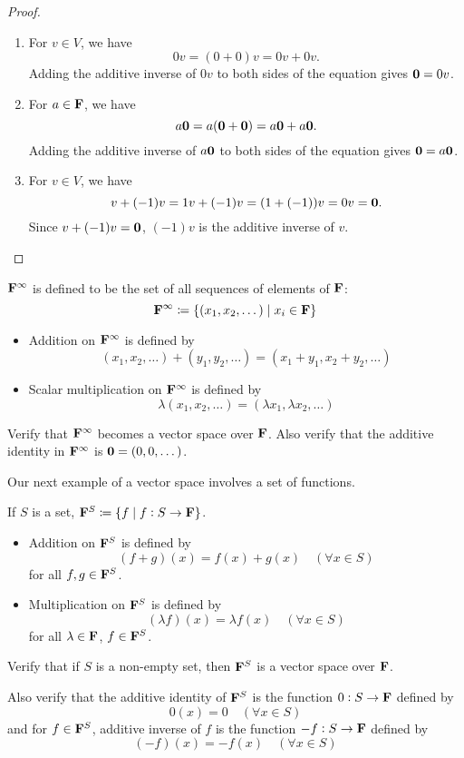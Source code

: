 \begin{proof} \
\begin{enumerate}[label=(\roman*)]
\item For $v\in V$, we have
\[0v=(0+0)v=0v+0v.\]
Adding the additive inverse of $0v$ to both sides of the equation gives $\vb{0}=0v$.

\item For $a\in\mathbf F$, we have
\[a\vb{0}=a(\vb{0}+\vb{0})=a\vb{0}+a\vb{0}.\]
Adding the additive inverse of $a\vb{0}$ to both sides of the equation gives $\vb{0}=a\vb{0}$.

\item For $v\in V$, we have
\[v+(-1)v=1v+(-1)v=(1+(-1))v=0v=\vb{0}.\]
Since $v+(-1)v=\vb{0}$, $(-1)v$ is the additive inverse of $v$.
\end{enumerate}
\end{proof}

\begin{example}
$\mathbf F^\infty$ is defined to be the set of all sequences of elements of $\mathbf F$:
\[\mathbf F^\infty\coloneqq\{(x_1,x_2,\dots)\mid x_i\in\mathbf F\}\]
\begin{itemize}
\item Addition on $\mathbf F^\infty$ is defined by
\[(x_1,x_2,\dots)+(y_1,y_2,\dots)=(x_1+y_1,x_2+y_2,\dots)\]
\item Scalar multiplication on $\mathbf F^\infty$ is defined by
\[\lambda(x_1,x_2,\dots)=(\lambda x_1,\lambda x_2,\dots)\]
\end{itemize}

Verify that $\mathbf F^\infty$ becomes a vector space over $\mathbf F$. Also verify that the additive identity in $\mathbf F^\infty$ is $\vb{0}=(0,0,\dots)$.
\end{example}

Our next example of a vector space involves a set of functions.

\begin{example}
If $S$ is a set, $\mathbf F^S\coloneqq\{f\mid f:S\to\mathbf F\}$.
\begin{itemize}
\item Addition on $\mathbf F^S$ is defined by 
\[(f+g)(x)=f(x)+g(x)\quad(\forall x\in S)\]
for all $f,g\in\mathbf F^S$.
\item Multiplication on $\mathbf F^S$ is defined by
\[(\lambda f)(x)=\lambda f(x)\quad(\forall x\in S)\]
for all $\lambda\in\mathbf F$, $f\in\mathbf F^S$.
\end{itemize}

Verify that if $S$ is a non-empty set, then $\mathbf F^S$ is a vector space over $\mathbf F$.

Also verify that the additive identity of $\mathbf F^S$ is the function $0:S\to\mathbf F$ defined by
\[0(x)=0\quad(\forall x\in S)\]
and for $f\in\mathbf F^S$, additive inverse of $f$ is the function $-f:S\to\mathbf F$ defined by
\[(-f)(x)=-f(x)\quad(\forall x\in S)\]
\end{example}

